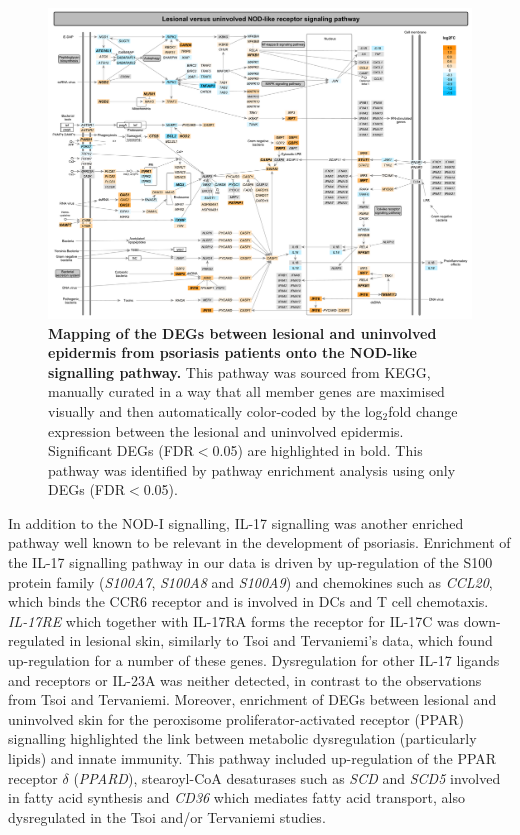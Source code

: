 \begin{landscape}
\begin{figure}[H]
\centering
\includegraphics[width=\textwidth]{./Results2/pdfs/PS_lesional_uninvolved_all_NOD_like_pathway}
\caption[Mapping of the DEGs between lesional and uninvolved epidermis from psoriasis patients onto the NOD-like signalling pathway.]{\textbf{Mapping of the DEGs between lesional and uninvolved epidermis from psoriasis patients onto the NOD-like signalling pathway.} This pathway was sourced from KEGG, manually curated in a way that all member genes are maximised visually and then automatically color-coded by the log$_2$fold change expression between the lesional and uninvolved epidermis. Significant DEGs (FDR$<$0.05) are highlighted in bold. This pathway was identified by pathway enrichment analysis using only DEGs (FDR$<$0.05).}
\label{figure:PS_lesional_vs_uninvolved_HIF_pathway}
\end{figure}
\end{landscape}


In addition to the NOD-I signalling, IL-17 signalling was another enriched pathway well known to be relevant in the development of psoriasis. Enrichment of the IL-17 signalling pathway in our data is driven by up-regulation of the S100 protein family (\textit{S100A7}, \textit{S100A8} and \textit{S100A9}) and chemokines such as \textit{CCL20}, which binds the CCR6 receptor and is involved in DCs and T cell chemotaxis. \textit{IL-17RE} which together with IL-17RA forms the receptor for IL-17C was down-regulated in lesional skin, similarly to Tsoi and Tervaniemi's data, which found up-regulation for a number of these genes. Dysregulation for other IL-17 ligands and receptors or IL-23A was neither detected, in contrast to the observations from Tsoi and Tervaniemi. Moreover, enrichment of DEGs between lesional and uninvolved skin for the peroxisome proliferator-activated receptor (PPAR) signalling highlighted the link between metabolic dysregulation (particularly lipids) and innate immunity. This pathway included up-regulation of the PPAR receptor $\delta$ (\textit{PPARD}), stearoyl-CoA desaturases such as \textit{SCD} and \textit{SCD5} involved in fatty acid synthesis and \textit{CD36} which mediates fatty acid transport, also dysregulated in the Tsoi and/or Tervaniemi studies.

